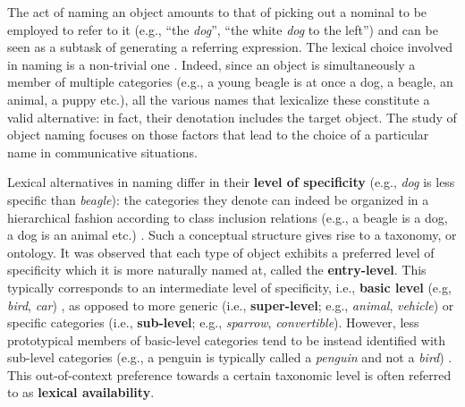 The act of naming an object amounts to that of picking out a nominal to be employed to refer to it (e.g., ``the \textit{dog}'', ``the white \textit{dog} to the left'') and can be seen as a subtask of generating a referring expression. The lexical choice involved in naming is a non-trivial one \cite{brown1958shall}. Indeed, since an object is simultaneously a member of multiple categories (e.g., a young beagle is at once a dog, a beagle, an animal, a puppy etc.), all the various names that lexicalize these constitute a valid alternative: in fact, their denotation includes the target object. The study of object naming focuses on those factors that lead to the choice of a particular name in communicative situations. 

Lexical alternatives in naming differ in their \textbf{level of specificity} (e.g., \textit{dog} is less specific than \textit{beagle})\cite{cruse1977pragmatics}: the categories they denote can indeed be organized in a hierarchical fashion according to class inclusion relations (e.g., a beagle is a dog, a dog is an animal etc.) \cite{murphy2004big}. Such a conceptual structure gives rise to a taxonomy, or ontology. %
It was observed that each type of object exhibits a preferred level of specificity which it is more naturally named at, called the \textbf{entry-level}. This typically corresponds to an intermediate level of specificity, i.e., \textbf{basic level} (e.g, \textit{bird}, \textit{car}) \cite{rosch1976basic}, as opposed to more generic (i.e., \textbf{super-level}; e.g., \textit{animal}, \textit{vehicle}) or specific categories (i.e., \textbf{sub-level}; e.g., \textit{sparrow}, \textit{convertible}). However, less prototypical members of basic-level categories tend to be instead identified with sub-level categories (e.g., a penguin is typically called a \textit{penguin} and not a \textit{bird}) \cite{jolicoeur1984pictures}. This out-of-context preference towards a certain taxonomic level is often referred to as \textbf{lexical availability}. 

